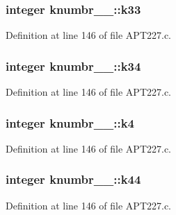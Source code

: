 \subsubsection[{\texorpdfstring{k33}{k33}}]{\setlength{\rightskip}{0pt plus 5cm}integer knumbr\+\_\+\_\+\+::k33}\hypertarget{structknumbr__1___a1f969a0eceed0f07473399a777e39cb0}{}\label{structknumbr__1___a1f969a0eceed0f07473399a777e39cb0}


Definition at line 146 of file A\+P\+T227.\+c.

\subsubsection[{\texorpdfstring{k34}{k34}}]{\setlength{\rightskip}{0pt plus 5cm}integer knumbr\+\_\+\_\+\+::k34}\hypertarget{structknumbr__1___a20a2eb2548ce704e4e044f3f02d3caad}{}\label{structknumbr__1___a20a2eb2548ce704e4e044f3f02d3caad}


Definition at line 146 of file A\+P\+T227.\+c.

\subsubsection[{\texorpdfstring{k4}{k4}}]{\setlength{\rightskip}{0pt plus 5cm}integer knumbr\+\_\+\_\+\+::k4}\hypertarget{structknumbr__1___a21bd34af90286ae20f2550d688549e47}{}\label{structknumbr__1___a21bd34af90286ae20f2550d688549e47}


Definition at line 146 of file A\+P\+T227.\+c.

\subsubsection[{\texorpdfstring{k44}{k44}}]{\setlength{\rightskip}{0pt plus 5cm}integer knumbr\+\_\+\_\+\+::k44}\hypertarget{structknumbr__1___ae18588bec077cc39f512d7c344109df7}{}\label{structknumbr__1___ae18588bec077cc39f512d7c344109df7}


Definition at line 146 of file A\+P\+T227.\+c.

